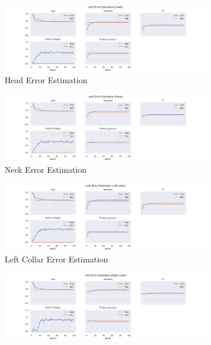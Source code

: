 \begin{figure}
  \centering
  \begin{subfigure}[b]{0.47\linewidth}
      \centering
      \includegraphics[width=\textwidth]{figures/Results/jt/JointErrorEstimation_Head.png}
      \caption{Head Error Estimation}
      \label{fig:head_jt_ee}
  \end{subfigure}
  \hfill
  \begin{subfigure}[b]{0.47\linewidth}
      \centering
      \includegraphics[width=\textwidth]{figures/Results/jt/JointErrorEstimation_Neck.png}
      \caption{Neck Error Estimation}
      \label{fig:neck_jt_ee}
  \end{subfigure}
  \hfill
  \begin{subfigure}[b]{0.47\linewidth}
      \centering
      \includegraphics[width=\textwidth]{figures/Results/jt/JointErrorEstimation_Left collar.png}
      \caption{Left Collar Error Estimation}
      \label{fig:leco_jt_ee}
  \end{subfigure}
  \hfill
  \begin{subfigure}[b]{0.47\linewidth}
      \centering
      \includegraphics[width=\textwidth]{figures/Results/jt/JointErrorEstimation_Right collar.png}

\end{subfigure}
\end{figure}
